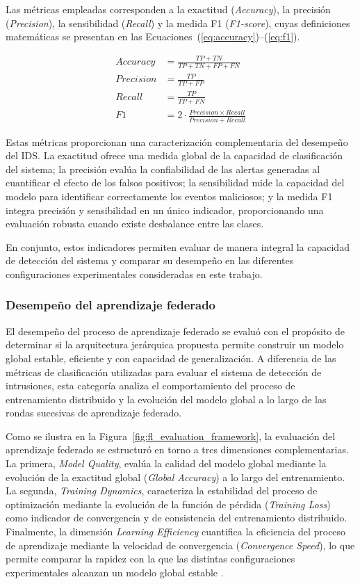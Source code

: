 \documentclass[journal,article,submit,moreauthors]{Definitions/mdpi}
\begin{document}
Las métricas empleadas corresponden a la exactitud (\textit{Accuracy}), la precisión (\textit{Precision}), la sensibilidad (\textit{Recall}) y la medida F1 (\textit{F1-score}), cuyas definiciones matemáticas se presentan en las Ecuaciones~(\ref{eq:accuracy})--(\ref{eq:f1}).

\begin{align}
Accuracy &= \frac{TP+TN}{TP+TN+FP+FN}
\label{eq:accuracy}\\[2mm]
Precision &= \frac{TP}{TP+FP}
\label{eq:precision}\\[2mm]
Recall &= \frac{TP}{TP+FN}
\label{eq:recall}\\[2mm]
F1 &= 2\cdot\frac{Precision \times Recall}{Precision+Recall}
\label{eq:f1}
\end{align}

Estas métricas proporcionan una caracterización complementaria del desempeño del IDS. La exactitud ofrece una medida global de la capacidad de clasificación del sistema; la precisión evalúa la confiabilidad de las alertas generadas al cuantificar el efecto de los falsos positivos; la sensibilidad mide la capacidad del modelo para identificar correctamente los eventos maliciosos; y la medida F1 integra precisión y sensibilidad en un único indicador, proporcionando una evaluación robusta cuando existe desbalance entre las clases.

En conjunto, estos indicadores permiten evaluar de manera integral la capacidad de detección del sistema y comparar su desempeño en las diferentes configuraciones experimentales consideradas en este trabajo.

\subsubsection{Desempeño del aprendizaje federado}
El desempeño del proceso de aprendizaje federado se evaluó con el propósito de determinar si la arquitectura jerárquica propuesta permite construir un modelo global estable, eficiente y con capacidad de generalización. A diferencia de las métricas de clasificación utilizadas para evaluar el sistema de detección de intrusiones, esta categoría analiza el comportamiento del proceso de entrenamiento distribuido y la evolución del modelo global a lo largo de las rondas sucesivas de aprendizaje federado.

Como se ilustra en la Figura~\ref{fig:fl_evaluation_framework}, la evaluación del aprendizaje federado se estructuró en torno a tres dimensiones complementarias. La primera, \textit{Model Quality}, evalúa la calidad del modelo global mediante la evolución de la exactitud global (\textit{Global Accuracy}) a lo largo del entrenamiento. La segunda, \textit{Training Dynamics}, caracteriza la estabilidad del proceso de optimización mediante la evolución de la función de pérdida (\textit{Training Loss}) como indicador de convergencia y de consistencia del entrenamiento distribuido. Finalmente, la dimensión \textit{Learning Efficiency} cuantifica la eficiencia del proceso de aprendizaje mediante la velocidad de convergencia (\textit{Convergence Speed}), lo que permite comparar la rapidez con la que las distintas configuraciones experimentales alcanzan un modelo global estable \cite{Cooray2025,Ma2024}.
\end{document}
